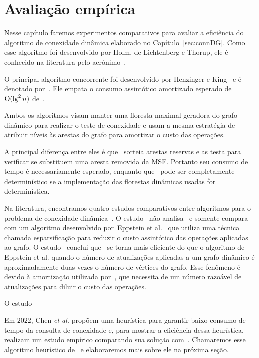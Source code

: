 \chapter{Avaliação empírica}
\label{sec:avaliacao-empirica}

Nesse capítulo faremos experimentos comparativos para avaliar a eficiência do algoritmo de conexidade dinâmica elaborado no Capítulo~\ref{sec:connDG}. Como esse algoritmo foi desenvolvido  por Holm, de Lichtenberg e Thorup, ele é conhecido na literatura pelo acrônimo~\HDT.

O principal algoritmo concorrente foi desenvolvido por Henzinger e King~\cite{HenzingerKing} e é denotado por~\HK.
Ele empata o consumo assintótico amortizado esperado de $\mathrm{O}(\lg^2 n)$ de~\HDT.

Ambos os algoritmos visam manter uma floresta maximal geradora do grafo dinâmico para realizar o teste de conexidade e usam a mesma estratégia de atribuir níveis às arestas do grafo para amortizar o custo das operações.

A principal diferença entre eles é que~\HK{} sorteia arestas reservas e as testa para verificar se substituem uma aresta removida da MSF. Portanto seu consumo de tempo é necessariamente esperado, enquanto que~\HDT{} pode ser completamente determinístico se a implementação das florestas dinâmicas usadas for determinística. 

Na literatura, encontramos quatro estudos comparativos entre algoritmos para o problema de conexidade dinâmica~\cite{EmpiricalStudy1997, EmpiricalStudy2002, Zaroliagis2002, QC22}.
O estudo~\cite{EmpiricalStudy1997} não analisa~\HDT{} e somente compara~\HK{} com um algoritmo desenvolvido por~Eppstein et al.~\cite{Eppstein1992SparsificationaTF} que utiliza uma técnica chamada esparsificação para reduzir o custo assintótico das operações aplicadas ao grafo.
O estudo~\cite{EmpiricalStudy1997} conclui que~\HK{} se torna mais eficiente do que o algoritmo de Eppstein et al. quando o número de atualizações aplicadas a um grafo dinâmico é aproximadamente duas vezes o número de vértices do grafo. Esse fenômeno é devido à amortização utilizada por~\HK{}, que necessita de um número razoável de atualizações para diluir o custo das operações. 



O estudo~\cite{EmpiricalStudy2002}

Em $2022$, Chen \textit{et al.}\cite{QC22} propõem uma heurística para garantir baixo consumo de tempo da consulta de conexidade e, para mostrar a eficiência dessa heurística, realizam um estudo empírico comparando sua solução com~\HK{}.
Chamaremos esse algoritmo heurístico de~\CLHB{} e elaboraremos mais sobre ele na próxima seção.

